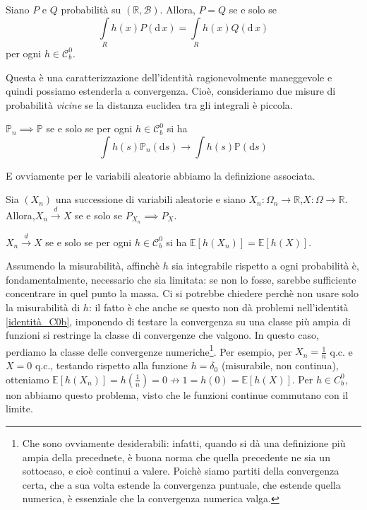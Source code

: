 \begin{my_lemma}
	\label{identità_C0b}
	Siano $P$ e $Q$ probabilità su $(\mathbb{R},\mathcal{B})$. Allora, $P=Q$ se e solo se
	\[
		\int\limits_R h(x) P(\mathrm{d}\,x)=\int\limits_R h(x) Q(\mathrm{d}\,x)	
	\]
	per ogni $h\in\mathcal{C}^0_b$.
\end{my_lemma}

Questa è una caratterizzazione dell'identità ragionevolmente maneggevole e quindi possiamo estenderla a convergenza. Cioè, consideriamo due misure di probabilità \textit{vicine} se la distanza euclidea tra gli integrali è piccola.


\begin{my_definition}
		$\mathbb{P}_{n} \implies \mathbb{P}$ se e solo se per ogni $h \in \mathcal{C}^0_b$ si ha $$\int h(s) \mathbb{P}_{n} (\mathrm{d} s) \to \int h(s) \mathbb{P} (\mathrm{d} s)$$
\end{my_definition}

E ovviamente per le variabili aleatorie abbiamo la definizione associata.

\begin{my_definition}
	Sia $(X_n)$ una successione di variabili aleatorie e siano $X_n:\Omega_n\to\mathbb{R}$,$X:\Omega\to\mathbb{R}$. Allora,$X_n \xrightarrow{d} X$ se e solo se $P_{X_n} \implies P_X$.
\end{my_definition}

\begin{my_lemma}
	\label{char_law_conv}
	$X_n \xrightarrow{d} X$ se e solo se per ogni $h \in \mathcal{C}^0_b$ si ha $\mathbb{E}\left[h(X_n)\right]=\mathbb{E}\left[h(X)\right]$.
\end{my_lemma}


\begin{my_remark}
	Assumendo la misurabilità, affinchè $h$ sia integrabile rispetto a ogni probabilità è, fondamentalmente, necessario che sia limitata: se non lo fosse, sarebbe sufficiente concentrare in quel punto la massa.
	Ci si potrebbe chiedere perchè non usare solo la misurabilità di $h$: il fatto è che anche se questo non dà problemi nell'identità \ref{identità_C0b}, imponendo di testare la convergenza su una classe più ampia di funzioni si restringe la classe di convergenze che valgono.
	In questo caso, perdiamo la classe delle convergenze numeriche\footnote{Che sono ovviamente desiderabili: infatti, quando si dà una definizione più ampia della precednete, è buona norma che quella precedente ne sia un sottocaso, e cioè continui a valere.
	Poichè siamo partiti della convergenza certa, che a sua volta estende la convergenza puntuale, che estende quella numerica, è essenziale che la convergenza numerica valga.}. 
	Per esempio, per $X_n = \frac{1}{n}$ q.c. e $X = 0$ q.c., testando rispetto alla funzione $h=\delta_0$ (misurabile, non continua), otteniamo $\mathbb{E}[h(X_n)] = h\left(\frac{1}{n}\right) = 0 \nrightarrow 1 = h(0) = \mathbb{E}[h(X)]$. Per $h\in C^0_b$, non abbiamo questo problema, visto che le funzioni continue commutano con il limite.
\end{my_remark}

